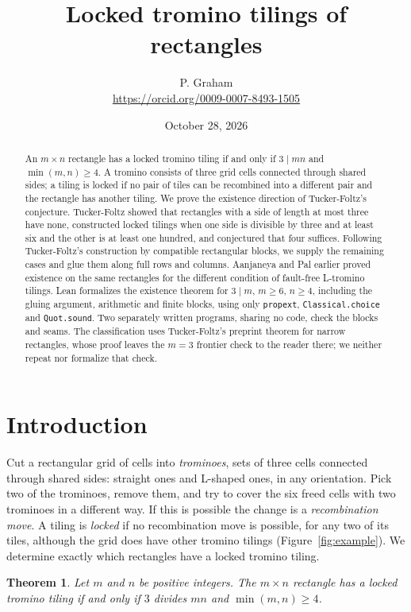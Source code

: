 \documentclass[11pt]{article}
\title{Locked tromino tilings of rectangles}
\author{P. Graham\\ \small\url{https://orcid.org/0009-0007-8493-1505}}
\date{October 28, 2026}
\newtheorem{theorem}{Theorem}
\theoremstyle{definition}
\theoremstyle{remark}
\begin{document}
\maketitle
\begin{abstract}
An $m\times n$ rectangle has a locked tromino tiling if and only if
$3\mid mn$ and $\min(m,n)\ge4$. A tromino consists of three grid cells
connected through shared sides; a tiling is locked if no pair of tiles can
be recombined into a different pair and the rectangle has another tiling.
We prove the existence direction of Tucker-Foltz's conjecture.
Tucker-Foltz showed that rectangles with a side of length at most three
have none, constructed
locked tilings when one side is divisible by three and at least six and
the other is at least one hundred, and conjectured that four suffices.
Following Tucker-Foltz's construction by compatible rectangular blocks,
we supply the remaining cases and glue them along full rows and columns.
Aanjaneya and Pal earlier proved existence on the same rectangles for the
different condition of fault-free L-tromino tilings. Lean formalizes the existence theorem for $3\mid m$, $m\ge6$, $n\ge4$,
including the gluing argument, arithmetic and finite blocks, using only
\texttt{propext}, \texttt{Classical.choice} and \texttt{Quot.sound}.
Two separately written programs, sharing no code, check the blocks and seams.
The classification uses Tucker-Foltz's preprint theorem for narrow
rectangles, whose proof leaves the $m=3$ frontier check to the reader
there; we neither repeat nor formalize that check.
\end{abstract}

\section{Introduction}

Cut a rectangular grid of cells into \emph{trominoes}, sets of three cells
connected through shared sides: straight ones and L-shaped ones, in any
orientation. Pick two of the trominoes, remove them, and try to cover the six
freed cells with two trominoes in a different way. If this is possible the
change is a \emph{recombination move}. A tiling is
\emph{locked} if no recombination move is possible, for any two of its
tiles, although the grid does have other tromino tilings
(Figure~\ref{fig:example}). We determine exactly which rectangles have a
locked tromino tiling.

\begin{theorem}\label{thm:main}
Let $m$ and $n$ be positive integers. The $m\times n$ rectangle has a locked
tromino tiling if and only if $3$ divides $mn$ and $\min(m,n)\ge4$.
\end{theorem}
\end{document}
